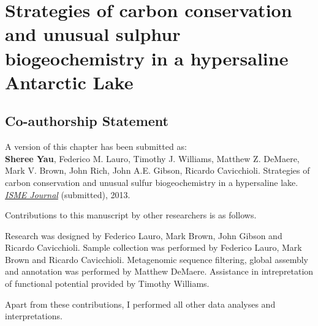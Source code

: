 \chapter{Strategies of carbon conservation and unusual sulphur biogeochemistry in a hypersaline Antarctic Lake}
\label{ch:org}
\acresetall

\section*{Co-authorship Statement}
A version of this chapter has been submitted as:\\

\textbf{Sheree Yau}, Federico M. Lauro, Timothy J. Williams, Matthew Z. DeMaere, Mark V. Brown, John Rich, 
John A.E. Gibson, Ricardo Cavicchioli. 
Strategies of carbon conservation and unusual sulfur biogeochemistry in a hypersaline lake.
\emph{\underline{ISME Journal}}
(submitted), 2013.

Contributions to this manuscript by other researchers is as follows.

Research was designed by Federico Lauro, Mark Brown, John Gibson and Ricardo Cavicchioli.
Sample collection was performed by Federico Lauro, Mark Brown and Ricardo Cavicchioli.
Metagenomic sequence filtering, global assembly and annotation was performed by Matthew DeMaere.
Assistance in intrepretation of functional potential provided by Timothy Williams.

Apart from these contributions, I performed all other data analyses and interpretations.
\newpage


